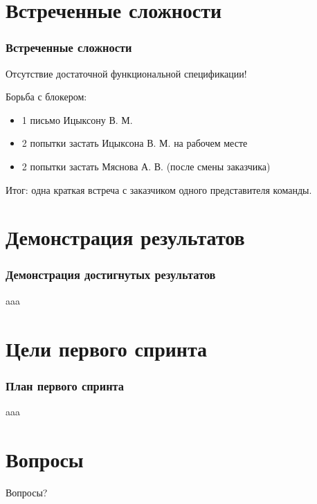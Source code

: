 \documentclass{beamer}
\begin{document}
\section{Встреченные сложности}

\begin{frame}
\frametitle{Встреченные сложности}

Отсутствие достаточной функциональной спецификации!
\bigskip

Борьба с блокером:
\begin{itemize}
\item 1 письмо Ицыксону В. М.
\item 2 попытки застать Ицыксона В. М. на рабочем месте
\item 2 попытки застать Мяснова А. В. (после смены заказчика)
\end{itemize}
\bigskip

Итог: одна краткая встреча с заказчиком одного представителя команды.

\end{frame}


\section{Демонстрация результатов}

\begin{frame}
\frametitle{Демонстрация достигнутых результатов}

aaa

\end{frame}

\section{Цели первого спринта}

\begin{frame}
\frametitle{План первого спринта}

aaa

\end{frame}

\section{Вопросы}

\begin{frame}
\Huge{\centerline{Вопросы?}}
\end{frame}

\end{document}
